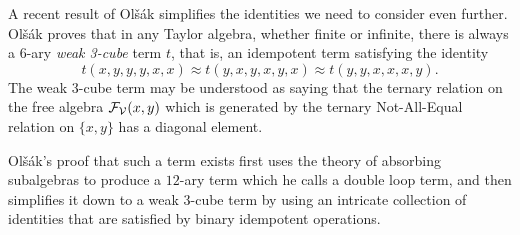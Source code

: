 \documentclass[letterpaper,11pt]{article}
\begin{document}
\begin{rem} A recent result of Ol{\v{s}}{\'a}k simplifies the identities we need to consider even further. Ol{\v{s}}{\'a}k \cite{olsak-weak} proves that in any Taylor algebra, whether finite or infinite, there is always a $6$-ary \emph{weak 3-cube} term $t$, that is, an idempotent term satisfying the identity
\[
t(x,y,y,y,x,x) \approx t(y,x,y,x,y,x) \approx t(y,y,x,x,x,y).
\]
The weak 3-cube term may be understood as saying that the ternary relation on the free algebra $\mathcal{F}_{\mathcal{V}}(x,y)$ which is generated by the ternary Not-All-Equal relation on $\{x,y\}$ has a diagonal element.

Ol{\v{s}}{\'a}k's proof that such a term exists first uses the theory of absorbing subalgebras to produce a $12$-ary term which he calls a double loop term, and then simplifies it down to a weak $3$-cube term by using an intricate collection of identities that are satisfied by binary idempotent operations.
\end{rem}
\end{document}
